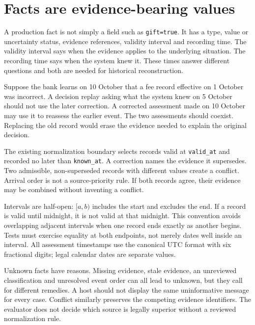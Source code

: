 \section{Facts are evidence-bearing values}
\label{merge:M07:01}


A production fact is not simply a field such as \texttt{gift=true}. It has a type,
value or uncertainty status, evidence references, validity interval and recording
time. The validity interval says when the evidence applies to the underlying
situation. The recording time says when the system knew it. These times answer
different questions and both are needed for historical reconstruction.

Suppose the bank learns on 10 October that a fee record effective on 1 October
was incorrect. A decision replay asking what the system knew on 5 October should
not use the later correction. A corrected assessment made on 10 October may use
it to reassess the earlier event. The two assessments should coexist. Replacing
the old record would erase the evidence needed to explain the original decision.

The existing normalization boundary selects records valid at \texttt{valid\_at}
and recorded no later than \texttt{known\_at}. A correction names the evidence it
supersedes. Two admissible, non-superseded records with different values create a
conflict. Arrival order is not a source-priority rule. If both records agree,
their evidence may be combined without inventing a conflict.


Intervals are half-open: $[a,b)$ includes the start and excludes the end. If a
record is valid until midnight, it is not valid at that midnight. This convention
avoids overlapping adjacent intervals when one record ends exactly as another
begins. Tests must exercise equality at both endpoints, not merely dates well
inside an interval. All assessment timestamps use the canonical UTC format with
six fractional digits; legal calendar dates are separate values.

Unknown facts have reasons. Missing evidence, stale evidence, an unreviewed
classification and unresolved event order can all lead to unknown, but they call
for different remedies. A host should not display the same uninformative message
for every case. Conflict similarly preserves the competing evidence identifiers.
The evaluator does not decide which source is legally superior without a
reviewed normalization rule.

